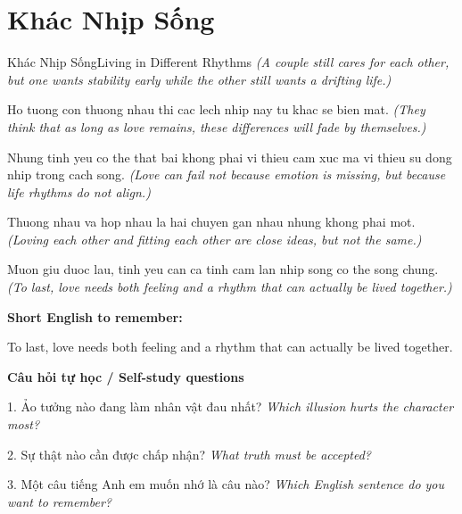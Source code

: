 \section{Khác Nhịp Sống}
\begin{truyen}{Khác Nhịp Sống}{Living in Different Rhythms}
\textit{(A couple still cares for each other, but one wants stability early while the other still wants a drifting life.)}

Ho tuong con thuong nhau thi cac lech nhip nay tu khac se bien mat.
\textit{(They think that as long as love remains, these differences will fade by themselves.)}

Nhung tinh yeu co the that bai khong phai vi thieu cam xuc ma vi thieu su dong nhip trong cach song.
\textit{(Love can fail not because emotion is missing, but because life rhythms do not align.)}

Thuong nhau va hop nhau la hai chuyen gan nhau nhung khong phai mot.
\textit{(Loving each other and fitting each other are close ideas, but not the same.)}

\end{truyen}

\begin{baihoc}
Muon giu duoc lau, tinh yeu can ca tinh cam lan nhip song co the song chung.
\textit{(To last, love needs both feeling and a rhythm that can actually be lived together.)}
\end{baihoc}

\begin{ghinhoanh}
\textbf{Short English to remember:}

To last, love needs both feeling and a rhythm that can actually be lived together.

\end{ghinhoanh}

\begin{tuhocnhanh}
\textbf{Câu hỏi tự học / Self-study questions}

1. Ảo tưởng nào đang làm nhân vật đau nhất? \textit{Which illusion hurts the character most?}

2. Sự thật nào cần được chấp nhận? \textit{What truth must be accepted?}

3. Một câu tiếng Anh em muốn nhớ là câu nào? \textit{Which English sentence do you want to remember?}
\end{tuhocnhanh}
\ngancach

